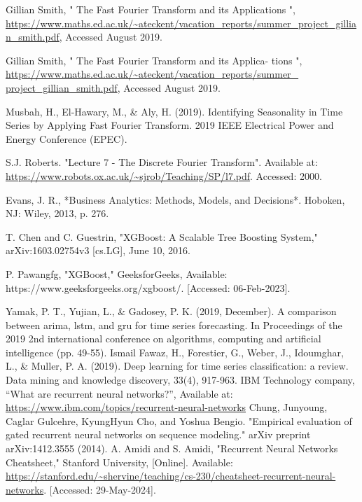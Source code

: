 \documentclass{ieeeojies}
\begin{document}
\begin{thebibliography}{00}
Gillian Smith, " The Fast Fourier Transform and its Applications ", \url{https://www.maths.ed.ac.uk/~ateckent/vacation_reports/summer_project_gillian_smith.pdf}, Accessed August 2019. 


Gillian Smith, " The Fast Fourier Transform and its Applica-
tions ",\url{ https://www.maths.ed.ac.uk/~ateckent/vacation_reports/summer_ project_gillian_smith.pdf}, Accessed August 2019.

Musbah, H., El-Hawary, M., \& Aly, H. (2019). Identifying Seasonality in
Time Series by Applying Fast Fourier Transform. 2019 IEEE Electrical
Power and Energy Conference (EPEC).

S.J. Roberts. "Lecture 7 - The Discrete Fourier Transform". Available at:
\url{https://www.robots.ox.ac.uk/~sjrob/Teaching/SP/l7.pdf}. Accessed: 2000.

Evans, J. R., *Business Analytics: Methods, Models, and Decisions*. Hoboken, NJ: Wiley, 2013, p. 276.

T. Chen and C. Guestrin, "XGBoost: A Scalable Tree Boosting System," arXiv:1603.02754v3 [cs.LG], June 10, 2016.

P. Pawangfg, "XGBoost," GeeksforGeeks, Available: https://www.geeksforgeeks.org/xgboost/. [Accessed: 06-Feb-2023].

Yamak, P. T., Yujian, L., \& Gadosey, P. K. (2019, December). A comparison between arima, lstm, and gru for time series forecasting. In Proceedings of the 2019 2nd international conference on algorithms, computing and artificial intelligence (pp. 49-55).
Ismail Fawaz, H., Forestier, G., Weber, J., Idoumghar, L., \& Muller, P. A. (2019). Deep learning for time series classification: a review. Data mining and knowledge discovery, 33(4), 917-963.
IBM Technology company, “What are recurrent neural networks?”, Available at: \url{https://www.ibm.com/topics/recurrent-neural-networks}
Chung, Junyoung, Caglar Gulcehre, KyungHyun Cho, and Yoshua Bengio. "Empirical evaluation of gated recurrent neural networks on sequence modeling." arXiv preprint arXiv:1412.3555 (2014).
A. Amidi and S. Amidi, "Recurrent Neural Networks Cheatsheet," Stanford University, [Online]. Available: \url{https://stanford.edu/~shervine/teaching/cs-230/cheatsheet-recurrent-neural-networks}. [Accessed: 29-May-2024]. 



\end{thebibliography}






\EOD
\end{document}
